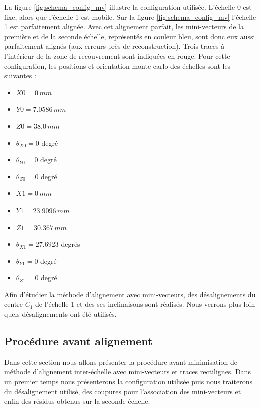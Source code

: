    \medskip 
   
   La figure \ref{fig:schema_config_mv} illustre la configuration utilis\'ee. L'\'echelle 0 est fixe, alors que l'échelle 1 est mobile. Sur la figure \ref{fig:schema_config_mv} l'\'echelle 1 est parfaitement align\'ee. Avec cet alignement parfait, les mini-vecteurs de la premi\`ere et de la seconde \'echelle, repr\'esent\'es en couleur bleu, sont donc eux aussi parfaitement align\'es (aux erreurs pr\`es de reconstruction). Trois traces \`a l'intérieur de la zone de recouvrement sont indiqu\'ees en rouge. Pour cette configuration, les positions et orientation monte-carlo des \'echelles sont les suivantes :
   
  \medskip
  
  \begin{multicols}{2}
  \renewcommand{\labelitemi}{$\bullet$}
  
  \begin{itemize}
   \item $X0 = 0 \, mm$ 
   \item $Y0 = 7.0586 \, mm$ 
   \item $Z0 = 38.0 \, mm$
   \item $\theta_{X0} = 0$ degr\'e 
   \item $\theta_{Y0} = 0$ degr\'e 
   \item $\theta_{Z0} = 0$ degr\'e
   \item $X1 = 0 \, mm$ 
   \item $Y1 = 23.9096 \, mm$ 
   \item $Z1 = 30.367 \, mm$
   \item $\theta_{X1} = 27.6923$ degr\'es
   \item $\theta_{Y1} = 0$ degr\'e 
   \item $\theta_{Z1} = 0$ degr\'e
  \end{itemize}
  \end{multicols}
  
  \medskip
  
   Afin d'\'etudier la m\'ethode d'alignement avec mini-vecteurs, des d\'esalignements du centre $C_1$ de l'\'echelle 1 et des ses inclinaisons sont r\'ealis\'es. Nous verrons plus loin quels d\'esalignements ont \'et\'e utilis\'es.
  
  \subsection{Proc\'edure avant alignement}

   Dans cette section nous allons pr\'esenter la proc\'edure avant minimisation de m\'ethode d'alignement inter-\'echelle avec mini-vecteurs et traces rectilignes. Dans un premier temps nous pr\'esenterons la configuration utilis\'ee puis nous traiterons du d\'esalignement utilis\'e, des coupures pour l'association des mini-vecteurs et enfin des r\'esidus obtenus sur la seconde \'echelle.
  
